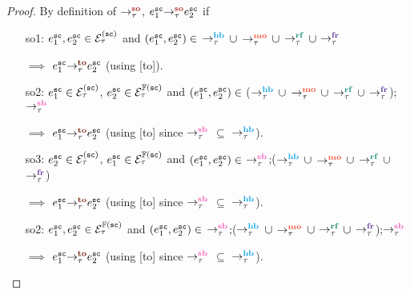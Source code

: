 {
	\label{lem:so subset to}}
\begin{proof}
		By definition of $\setSO$, $\so{\tau}{e^\sc_1}{e^\sc_2}$ if
		\begin{itemize}[label=so4,align=left,leftmargin=*]
			\item [so1:] $e^\sc_1, e^\sc_2 \in \ordevents{\sc}_\tau$
				and $(e^\sc_1, e^\sc_2) \in$ $\setHB$ $\union$ 
				$\setMO$ $\union$ $\setRF$ $\union$ $\setFR$
				
				$\implies$ $\to{\tau}{e^\sc_1}{e^\sc_2}$
				(using [to]).
				
			\item [so2:] $e^\sc_1 \in \ordevents{\sc}_\tau$,
				$e^\sc_2 \in \ordfences{\sc}_\tau$
				and $(e^\sc_1, e^\sc_2) \in$ ($\setHB$ $\union$ 
				$\setMO$ $\union$ $\setRF$ $\union$ $\setFR$);$\setSB$
			
				$\implies$ $\to{\tau}{e^\sc_1}{e^\sc_2}$
				(using [to] since $\setSB$ $\subseteq$ $\setHB$).
				
			\item [so3:] $e^\sc_2 \in \ordevents{\sc}_\tau$,
				$e^\sc_1 \in \ordfences{\sc}_\tau$
				and $(e^\sc_1, e^\sc_2) \in$ $\setSB$;($\setHB$ 
				$\union$ $\setMO$ $\union$ $\setRF$ $\union$ $\setFR$)
			
				$\implies$ $\to{\tau}{e^\sc_1}{e^\sc_2}$
				(using [to] since $\setSB$ $\subseteq$ $\setHB$).
				
			\item [so2:] $e^\sc_1, e^\sc_2 \in \ordfences{\sc}_\tau$
				and $(e^\sc_1, e^\sc_2) \in$ $\setSB$;($\setHB$ $\union$ 
				$\setMO$ $\union$ $\setRF$ $\union$ $\setFR$);$\setSB$
			
				$\implies$ $\to{\tau}{e^\sc_1}{e^\sc_2}$
				(using [to] since $\setSB$ $\subseteq$ $\setHB$).
		\end{itemize}
\end{proof}


